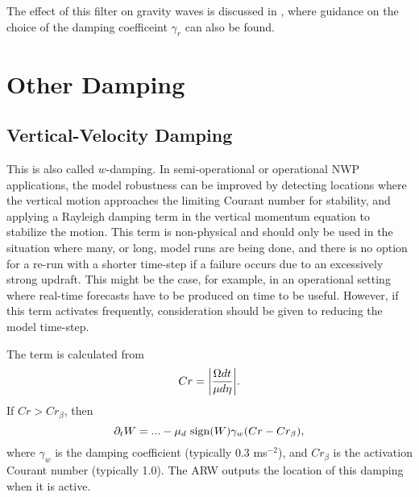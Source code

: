 The effect of this filter on gravity waves is discussed in
\citet{klemp_and_lilly78}, where guidance on the choice of 
the damping coefficeint $\gamma_r$ can also be found.

\section{Other Damping}

\subsection{Vertical-Velocity Damping}

This is also called $w$-damping.
In semi-operational or operational NWP applications,
the model robustness can be improved by detecting locations where the
vertical motion approaches the limiting Courant number for stability,
and applying a Rayleigh damping term in the vertical momentum equation to
stabilize the motion.  This term is non-physical and should
only be used in the situation where many, or long, model runs are being
done, and there is no option for a re-run with a shorter time-step if a 
failure occurs due to an excessively strong updraft. This might be the
case, for example, in an operational setting where real-time forecasts 
have to be produced on time to be useful. However, if this term activates
frequently, consideration should be given to reducing the model time-step.

The term is calculated from
%
\begin{equation}
Cr = \bigg | { \Omega dt \over \mu d\eta }\bigg |.
\notag
\end{equation}
%
\noindent
If $Cr > Cr_\beta$, then
\begin{equation}
\partial_t W = ... - \mu_d ~{\rm sign} (W) \gamma_w ( Cr - Cr_\beta ),
\notag
\end{equation}
%
\noindent 
where $\gamma_w$ is the damping coefficient 
(typically 0.3 ms$^{-2}$), and $Cr_\beta$ 
is the activation Courant number (typically 1.0).  The ARW outputs
the location of this damping when it is active.
